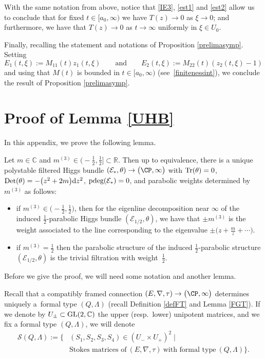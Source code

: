 With the same notation from above, notice that \eqref{IE3}, \eqref{est1} and \eqref{est2} allow us to conclude that for fixed $t\in [a_0,\infty)$ we have $T(z) \to 0$ as $\xi \to 0$; and furthermore, we have that $T(z) \to 0$ as $t\to \infty$ uniformly in $\xi \in U_{0}$.

Finally, recalling the statement and notations of Proposition \ref{prelimasymp}. Setting
\[
E_1(t,\xi):= M_{11}(t) z_1(t,\xi) \qquad \text{and} \qquad E_2(t,\xi):=M_{22}(t)(z_2(t,\xi)-1)
\]
 and using that $M(t)$ is bounded in $t\in [a_0,\infty)$ (see~\eqref{finitenessint}), we conclude the result of Proposition \ref{prelimasymp}.

\section{Proof of Lemma \ref{UHB}} \label{af}

In this appendix, we prove the following lemma.

\begin{Lemma}\label{mainlemma}
Let $m\in \mathbb{C}$ and $m^{(3)}\in \bigl(-\frac12,\frac12\bigr] \subset \mathbb{R}$. Then up to equivalence, there is a unique polystable filtered Higgs bundle $(\mathcal{E}_*,\theta)\to \bigl(\CP,\infty\bigr)$ with $\textnormal{Tr}(\theta)=0$, $\textnormal{Det}(\theta)=-\bigl(z^2+2m\bigr){\rm d}z^2$, $\textnormal{pdeg}(\mathcal{E}_*)=0$, and parabolic weights determined by $m^{(3)}$ as follows:
\begin{itemize}\itemsep=0pt
 \item if $m^{(3)} \in \bigl(-\frac12,\frac12\bigr)$, then for the eigenline decomposition near $\infty$ of the induced $\frac12$-parabolic Higgs bundle $(\mathcal{E}_{1/2},\theta)$, we have that $\pm m^{(3)}$ is the weight associated to the line corresponding to the eigenvalue $\pm\bigl(z+\frac{m}{z}+\cdots \bigr)$.
 \item if $m^{(3)}=\frac12$ then the parabolic structure of the induced $\frac12$-parabolic structure $(\mathcal{E}_{1/2},\theta)$ is the trivial filtration with weight~$\frac12$.
\end{itemize}
\end{Lemma}

Before we give the proof, we will need some notation and another lemma.

Recall that a compatibly framed connection $(E,\nabla,
\tau)\to \bigl(\CP,\infty\bigr)$ determines uniquely a~formal type $(Q,\Lambda)$ (recall Definition \ref{defFT} and Lemma \ref{FGT}). If we denote by $U_{\pm}\subset {\rm GL}(2,\mathbb{C})$ the upper (resp.\ lower) unipotent matrices, and we fix a formal type $(Q,\Lambda)$, we will denote
 \begin{align*}
 \mathcal{S}(Q,\Lambda):= \bigl\{&(S_1,S_2,S_3,S_4)\in (U_{-}\times U_{+})^2 \mid \\
 & \text{Stokes matrices of} \ (E,\nabla,
 \tau) \ \text{with formal type} \ (Q,\Lambda)\bigr\}.
 \end{align*}

